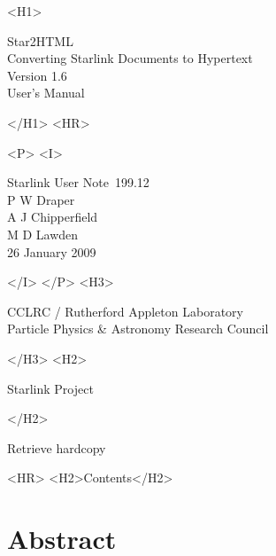 \documentclass[twoside,11pt]{article}
\newcommand{\stardoccategory}  {Starlink User Note}
\newcommand{\stardocsource}    {sun\stardocnumber}
\newcommand{\stardocnumber}    {199.12}
\newcommand{\stardocauthors}   {P W Draper\\
                                A J Chipperfield\\
                                M D Lawden}
\newcommand{\stardocdate}      {26 January 2009}
\newcommand{\stardoctitle}     {Star2HTML\\[1ex]
                                Converting Starlink Documents to Hypertext}
\newcommand{\stardocversion}   {Version 1.6}
\newcommand{\stardocmanual}    {User's Manual}
\newcommand{\htmladdnormallink}[2]{#1}
\newcommand{\htmladdimg}[1]{}
\newcommand{\htmlref}[2]{#1}
\newcommand{\htmladdtonavigation}[1]{}
\newcommand{\xlabel}[1]{}
\renewcommand{\_}{\texttt{\symbol{95}}}
\begin{document}
\begin{htmlonly}
   \xlabel{}
   \begin{rawhtml} <H1> \end{rawhtml}
      \stardoctitle\\
      \stardocversion\\
      \stardocmanual
   \begin{rawhtml} </H1> <HR> \end{rawhtml}


   \begin{rawhtml} <P> <I> \end{rawhtml}
   \stardoccategory\ \stardocnumber \\
   \stardocauthors \\
   \stardocdate
   \begin{rawhtml} </I> </P> <H3> \end{rawhtml}
      \htmladdnormallink{CCLRC / Rutherford Appleton Laboratory}
                        {http://www.scitech.ac.uk} \\
      \htmladdnormallink{Particle Physics \& Astronomy Research Council}
                        {http://www.scitech.ac.uk} \\
   \begin{rawhtml} </H3> <H2> \end{rawhtml}
      \htmladdnormallink{Starlink Project}{http://www.starlink.ac.uk/}
   \begin{rawhtml} </H2> \end{rawhtml}
   \htmladdnormallink{\htmladdimg{source.gif} Retrieve hardcopy}
      {http://www.starlink.ac.uk/cgi-bin/hcserver?\stardocsource}\\

  \label{stardoccontents}
  \begin{rawhtml}
    <HR>
    <H2>Contents</H2>
  \end{rawhtml}
  \htmladdtonavigation{\htmlref{\htmladdimg{contents_motif.gif}}
        {stardoccontents}}

  \section{\xlabel{abstract}Abstract}
\end{htmlonly}
\end{document}
